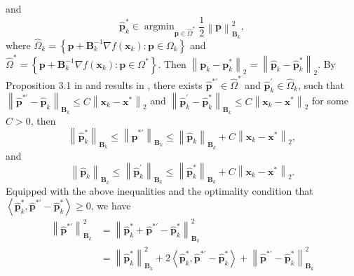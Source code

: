 \documentclass[aos]{imsart}
\numberwithin{equation}{section}
\theoremstyle{plain}
\begin{document}
\begin{appendix}
\begin{equation*}
    \end{equation*}
    and
    \begin{equation*}
        \hat{\bm{p}}_{k}^{*} \in \mathop{\arg \min}_{\bm{p} \in \widehat{\Omega}^{*}} \frac{1}{2}\left\| \bm{p} \right\|_{\bm{B}_k}^2,
    \end{equation*}
    where $\widehat{\Omega}_{k} = \left\{\bm{p} + \bm{B}_{k}^{-1} \nabla f(\bm{x}_{k}): \bm{p} \in \Omega_{k} \right\}$ and  $\widehat{\Omega}^{*} = \left \{\bm{p} + \bm{B}_{k}^{-1} \nabla f(\bm{x}_{k}): \bm{p} \in \Omega^{*} \right\}$. Then $\left \| \bm{p}_{k} - \bm{p}_{k}^{*} \right\|_2 = \left \| \hat{\bm{p}}_{k} - \hat{\bm{p}}_{k}^{*} \right\|_2$. By Proposition 3.1 in \cite{daniel1973stability} and results in \cite{hoffman2003approximate}, there exists $\hat{\bm{p}}^{* \prime} \in \widehat{\Omega}^{*}$ and $\hat{\bm{p}}_{k}^{\prime} \in \widehat{\Omega}_{k}$, such that $\left\| \hat{\bm{p}}^{* \prime} - \hat{\bm{p}}_{k}  \right\|_{\bm{B}_k} \leq C \left\| \bm{x}_{k} - \bm{x}^{*} \right\|_2$ and $\left\| \hat{\bm{p}}_{k}^{\prime} - \hat{\bm{p}}_{k}^{*}  \right\|_{\bm{B}_k} \leq C \left\| \bm{x}_{k} - \bm{x}^{*} \right\|_2$ for some $C >0$, then 
    \begin{equation*}
        \left\|  \hat{\bm{p}}_{k}^{*} \right\|_{\bm{B}_{k}} \leq \left\| \hat{\bm{p}}^{* \prime} \right\|_{\bm{B}_k} \leq \left\| \hat{\bm{p}}_{k}  \right\|_{\bm{B}_k} + C  \left\| \bm{x}_{k} - \bm{x}^{*} \right\|_2,
    \end{equation*}
   and
    \begin{equation*}
        \left\|  \hat{\bm{p}}_{k}  \right\|_{\bm{B}_{k}} \leq \left\| \hat{\bm{p}}_{k}^{\prime} \right\|_{\bm{B}_k} \leq \left\| \hat{\bm{p}}_{k}^{*}  \right\|_{\bm{B}_k} + C  \left\| \bm{x}_{k} - \bm{x}^{*} \right\|_2.
    \end{equation*}
    Equipped with the above inequalities and the optimality condition that $\left\langle  \hat{\bm{p}}_{k}^{*}, \hat{\bm{p}}^{* \prime} -  \hat{\bm{p}}_{k}^{*} \right \rangle \geq 0$, we have 
    \begin{equation*}
        \begin{split}
            \left\| \hat{\bm{p}}^{* \prime} \right\|_{\bm{B}_{k}}^2 & =  \left\|  \hat{\bm{p}}_{k}^{*}  + \hat{\bm{p}}^{* \prime} - \hat{\bm{p}}_{k}^{*} \right\|_{\bm{B}_{k}}^2 \\
            & =  \left\|  \hat{\bm{p}}_{k}^{*}  \right\|_{\bm{B}_{k}}^2 + 2 \left\langle  \hat{\bm{p}}_{k}^{*}, \hat{\bm{p}}^{* \prime} -  \hat{\bm{p}}_{k}^{*} \right \rangle + \left\|   \hat{\bm{p}}^{* \prime} - \hat{\bm{p}}_{k}^{*} \right\|_{\bm{B}_{k}}^2 \\

\end{split}
\end{equation*}
\end{appendix}
\end{document}
